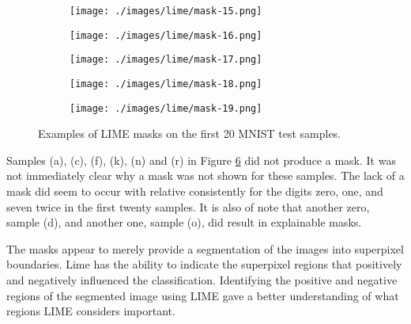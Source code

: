 \begin{figure}[H]
    \begin{subfigure}{.19\columnwidth}
        \centering
        \texttt{[image: ./images/lime/mask-15.png]}
        \caption{}
        \label{fig:lime_mnist15}
    \end{subfigure}%
    \begin{subfigure}{.19\columnwidth}
        \centering
        \texttt{[image: ./images/lime/mask-16.png]}
        \caption{}
        \label{fig:lime_mnist16}
    \end{subfigure}%
    \begin{subfigure}{.19\columnwidth}
        \centering
        \texttt{[image: ./images/lime/mask-17.png]}
        \caption{}
        \label{fig:lime_mnist17}
    \end{subfigure}
    \begin{subfigure}{.19\columnwidth}
        \centering
        \texttt{[image: ./images/lime/mask-18.png]}
        \caption{}
        \label{fig:lime_mnist18}
    \end{subfigure}%
    \begin{subfigure}{.19\columnwidth}
        \centering
        \texttt{[image: ./images/lime/mask-19.png]}
        \caption{}
        \label{fig:lime_mnist19}
    \end{subfigure}

    \caption{Examples of LIME masks on the first 20 MNIST test samples.}
    \label{fig:lime_mnist_masks}
\end{figure}

Samples (a), (c), (f), (k), (n) and (r) in Figure \ref{fig:lime_mnist_masks} did
not produce a mask.  It was not immediately clear why a mask was not shown for
these samples. The lack of a mask did seem to occur with relative consistently
for the digits zero, one, and seven twice in the first twenty samples. It is
also of note that another zero, sample (d), and another one, sample (o), did result
in explainable masks.

The masks appear to merely provide a segmentation of the images into superpixel
boundaries. Lime has the ability to indicate the superpixel regions that
positively and negatively influenced the classification.  Identifying the
positive and negative regions of the segmented image using LIME gave a better
understanding of what regions LIME considers important.

